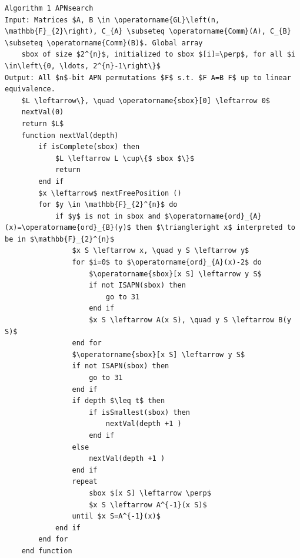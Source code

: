 \documentclass[10pt]{article}
\begin{document}
\begin{verbatim}
Algorithm 1 APNsearch
Input: Matrices $A, B \in \operatorname{GL}\left(n, \mathbb{F}_{2}\right), C_{A} \subseteq \operatorname{Comm}(A), C_{B} \subseteq \operatorname{Comm}(B)$. Global array
    sbox of size $2^{n}$, initialized to sbox $[i]=\perp$, for all $i \in\left\{0, \ldots, 2^{n}-1\right\}$
Output: All $n$-bit APN permutations $F$ s.t. $F A=B F$ up to linear equivalence.
    $L \leftarrow\}, \quad \operatorname{sbox}[0] \leftarrow 0$
    nextVal(0)
    return $L$
    function nextVal(depth)
        if isComplete(sbox) then
            $L \leftarrow L \cup\{$ sbox $\}$
            return
        end if
        $x \leftarrow$ nextFreePosition ()
        for $y \in \mathbb{F}_{2}^{n}$ do
            if $y$ is not in sbox and $\operatorname{ord}_{A}(x)=\operatorname{ord}_{B}(y)$ then $\triangleright x$ interpreted to be in $\mathbb{F}_{2}^{n}$
                $x S \leftarrow x, \quad y S \leftarrow y$
                for $i=0$ to $\operatorname{ord}_{A}(x)-2$ do
                    $\operatorname{sbox}[x S] \leftarrow y S$
                    if not ISAPN(sbox) then
                        go to 31
                    end if
                    $x S \leftarrow A(x S), \quad y S \leftarrow B(y S)$
                end for
                $\operatorname{sbox}[x S] \leftarrow y S$
                if not ISAPN(sbox) then
                    go to 31
                end if
                if depth $\leq t$ then
                    if isSmallest(sbox) then
                        nextVal(depth +1 )
                    end if
                else
                    nextVal(depth +1 )
                end if
                repeat
                    sbox $[x S] \leftarrow \perp$
                    $x S \leftarrow A^{-1}(x S)$
                until $x S=A^{-1}(x)$
            end if
        end for
    end function
\end{verbatim}
\end{document}
